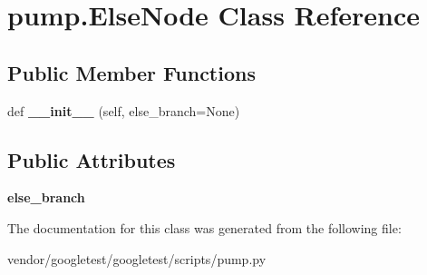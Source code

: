 \hypertarget{classpump_1_1_else_node}{}\section{pump.\+Else\+Node Class Reference}
\label{classpump_1_1_else_node}
\subsection*{Public Member Functions}
\begin{DoxyCompactItemize}
\item 
\mbox{\label{classpump_1_1_else_node_a7489ff8c6c7ddfe6bd6593b8ecccd819}} 
def {\bfseries \+\_\+\+\_\+init\+\_\+\+\_\+} (self, else\+\_\+branch=None)
\end{DoxyCompactItemize}
\subsection*{Public Attributes}
\begin{DoxyCompactItemize}
\item 
\mbox{\label{classpump_1_1_else_node_ac838a0fe9f5d713c7f56939eed5e128d}} 
{\bfseries else\+\_\+branch}
\end{DoxyCompactItemize}


The documentation for this class was generated from the following file\+:\begin{DoxyCompactItemize}
\item 
vendor/googletest/googletest/scripts/pump.\+py\end{DoxyCompactItemize}
